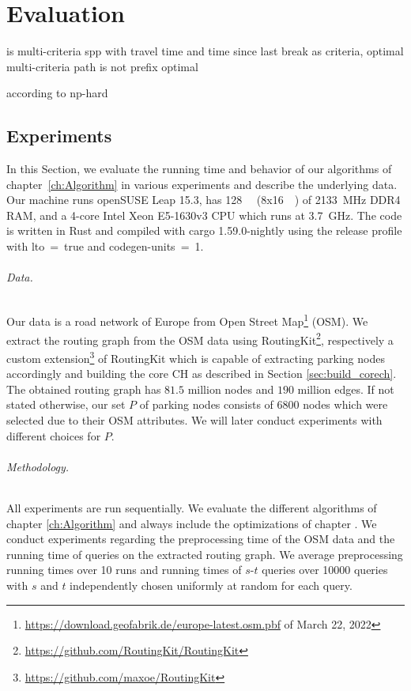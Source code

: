
\chapter{Evaluation}
\label{ch:Evaluation}
is multi-criteria spp with travel time and time since last break as criteria, optimal multi-criteria path is not prefix optimal  \cite{tuin:2018}

according to \cite{hansen:1980} np-hard

\section{Experiments}
In this Section, we evaluate the running time and behavior of our algorithms of chapter~\ref{ch:Algorithm} in various experiments and describe the underlying data. Our machine runs openSUSE Leap 15.3, has \SI{128}{\giga\byte} (8x\SI{16}{\giga\byte}) of \SI{2133}{\mega\hertz} DDR4 RAM, and a 4-core Intel Xeon E5-1630v3 CPU which runs at \SI{3.7}{\giga\hertz}. The code is written in Rust and compiled with cargo 1.59.0-nightly using the release profile with lto~=~true and codegen-units~=~1.

\subparagraph{Data.} Our data is a road network of Europe from Open Street Map\footnote{\url{https://download.geofabrik.de/europe-latest.osm.pbf} of March 22, 2022} (OSM). We extract the routing graph from the OSM data using RoutingKit\footnote{\url{https://github.com/RoutingKit/RoutingKit}}, respectively a custom extension\footnote{\url{https://github.com/maxoe/RoutingKit}} of RoutingKit which is capable of extracting parking nodes accordingly and building the core CH as described in Section \ref{sec:build_corech}. The obtained routing graph has $81.5$ million nodes and $190$ million edges. If not stated otherwise, our set $P$ of parking nodes consists of 6800 nodes which were selected due to their OSM attributes. We will later conduct experiments with different choices for $P$.

\subparagraph{Methodology.} All experiments are run sequentially. We evaluate the different algorithms of chapter \ref{ch:Algorithm} and always include the optimizations of chapter . We conduct experiments regarding the preprocessing time of the OSM data and the running time of queries on the extracted routing graph. We average preprocessing running times over 10 runs and running times of $s$-$t$ queries over \num{10000} queries with $s$ and $t$ independently chosen uniformly at random for each query.

